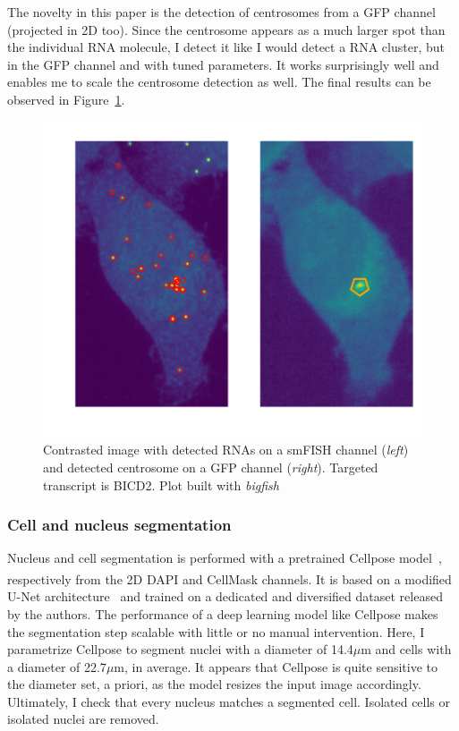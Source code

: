 The novelty in this paper is the detection of centrosomes from a \ac{GFP} channel (projected in 2D too).
Since the centrosome appears as a much larger spot than the individual \ac{RNA} molecule, I detect it like I would detect a \ac{RNA} cluster, but in the \ac{GFP} channel and with tuned parameters.
It works surprisingly well and enables me to scale the centrosome detection as well.
The final results can be observed in Figure~\ref{fig:centrosomes}.

\begin{figure}[]
    \centering
    \includegraphics[width=\textwidth]{figures/chapter5/centrosomes}
    \caption[RNA and centrosome detection results]{Contrasted image with detected RNAs on a smFISH channel (\textit{left}) and detected centrosome on a GFP channel (\textit{right}).
	Targeted transcript is BICD2.
	Plot built with \emph{bigfish}}
    \label{fig:centrosomes}
\end{figure}

\subsubsection{Cell and nucleus segmentation}

Nucleus and cell segmentation is performed with a pretrained Cellpose model~\cite{stringer_cellpose_2021}, respectively from the 2D DAPI and CellMask\textsuperscript{\texttrademark} channels.
It is based on a modified U-Net architecture~\cite{Ronneberger_unet} and trained on a dedicated and diversified dataset released by the authors.
The performance of a deep learning model like Cellpose makes the segmentation step scalable with little or no manual intervention.
Here, I parametrize Cellpose to segment nuclei with a diameter of 14.4$\mu$m and cells with a diameter of 22.7$\mu$m, in average.
It appears that Cellpose is quite sensitive to the diameter set, a priori, as the model resizes the input image accordingly.
Ultimately, I check that every nucleus matches a segmented cell.
Isolated cells or isolated nuclei are removed.

